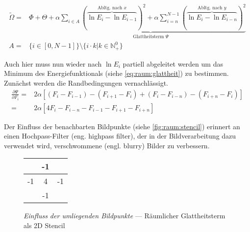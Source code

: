 \begin{align}
\label{eq:raum:glattheit}
\tilde{\Omega} =& 
    \Phi + \Theta +
    \underbrace{
        \alpha \sum_{i\in A}
            (\overbrace{
                \ln E_i - \ln E_{i-1}
            }^{\mbox{Abltg. nach }x}
        )^2
        +\alpha \sum_{i=n}^{N-1}(
            \overbrace{
                \ln E_i - \ln E_{i-n}
            }^{\mbox{Abltg. nach }y}
        )^2
    }_{\mbox{Glattheitsterm }\Psi}\\
    \label{eq:raum:x}
    A=& \{ i \in [0,N-1]\} \setminus \{ i \cdot k | k \in \mathbb{N}_+^0 \}
\end{align}

Auch hier muss nun wieder nach $\ln E_i$ partiell abgeleitet werden um das Minimum des Energiefunktionals (siehe \autoref{eq:raum:glattheit}) zu bestimmen. Zunächst werden die Randbedingungen vernachlässigt.
\begin{align}
\label{eq:raum:derivate}
\frac{\partial \Psi}{\partial F_i} =& 2\alpha[(F_i - F_{i-1}) - (F_{i+1} - F_i) + (F_i - F_{i-n})-(F_{i+n}- F_i)]\\
=&2\alpha[4 F_i-F_{i-n} - F_{i-1} - F_{i+1} - F_{i+n}]
\end{align}


Der Einfluss der benachbarten Bildpunkte (siehe \autoref{fig:raum:stencil}) erinnert an einen Hochpass-Filter (eng. highpass filter), der in der Bildverarbeitung dazu verwendet wird, verschwommene (engl. blurry) Bilder zu verbessern.

\begin{figure}[h]
  \begin{center}
    \begin{tabular}{c|c|c}
        \cline{2-2}
        & -1 & \\
        \hline
        \multicolumn{1}{|c|}{-1}
        & 4 & \multicolumn{1}{c|}{-1}\\
        \hline
        & -1 & \\
        \cline{2-2} 
    \end{tabular}
  \end{center}
\caption{\textit{Einfluss der umliegenden Bildpunkte} --- Räumlicher Glattheitsterm als 2D Stencil}
\label{fig:raum:stencil}
\end{figure}

